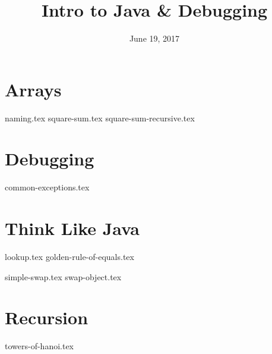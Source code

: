 \documentclass{exam}
\title{Intro to Java \& Debugging}
\date{June 19, 2017}
\begin{document}
\maketitle

\section{Arrays}
\begin{questions}
{naming.tex}
{square-sum.tex}
\clearpage
{square-sum-recursive.tex}
\end{questions}

\section{Debugging}
\begin{questions}
{common-exceptions.tex}
\end{questions}

\clearpage

\section{Think Like Java}
{lookup.tex}
{golden-rule-of-equals.tex}
\begin{questions}
{simple-swap.tex}
{swap-object.tex}
\end{questions}

\section{Recursion}
\begin{questions}
{towers-of-hanoi.tex}
\end{questions}
\end{document}
